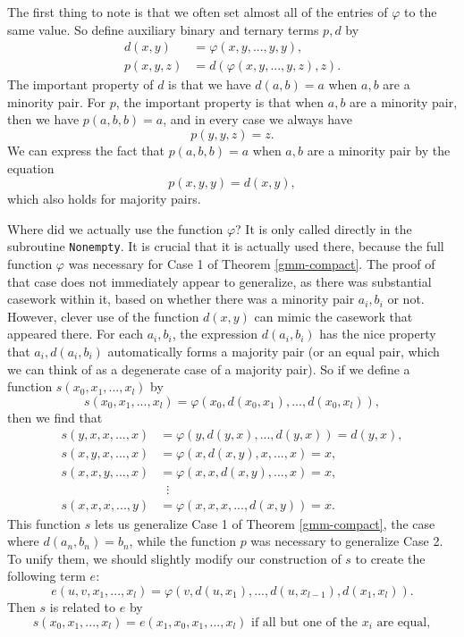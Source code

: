 \documentclass[letterpaper,11pt]{article}
\begin{document}
The first thing to note is that we often set almost all of the entries of $\varphi$ to the same value. So define auxiliary binary and ternary terms $p,d$ by
\begin{align*}
d(x,y) &= \varphi(x,y,...,y,y),\\
p(x,y,z) &= d(\varphi(x,y,...,y,z),z).
\end{align*}
The important property of $d$ is that we have $d(a,b) = a$ when $a,b$ are a minority pair. For $p$, the important property is that when $a,b$ are a minority pair, then we have $p(a,b,b) = a$, and in every case we always have
\[
p(y,y,z) = z.
\]
We can express the fact that $p(a,b,b) = a$ when $a,b$ are a minority pair by the equation
\[
p(x,y,y) = d(x,y),
\]
which also holds for majority pairs.

Where did we actually use the function $\varphi$? It is only called directly in the subroutine \texttt{Nonempty}. It is crucial that it is actually used there, because the full function $\varphi$ was necessary for Case 1 of Theorem \ref{gmm-compact}. The proof of that case does not immediately appear to generalize, as there was substantial casework within it, based on whether there was a minority pair $a_i,b_i$ or not. However, clever use of the function $d(x,y)$ can mimic the casework that appeared there. For each $a_i, b_i$, the expression $d(a_i,b_i)$ has the nice property that $a_i, d(a_i,b_i)$ automatically forms a majority pair (or an equal pair, which we can think of as a degenerate case of a majority pair). So if we define a function $s(x_0,x_1, ..., x_l)$ by
\[
s(x_0, x_1,..., x_l) = \varphi(x_0,d(x_0,x_1), ..., d(x_0,x_l)),
\]
then we find that
\begin{align*}
s(y,x,x,...,x) &= \varphi(y,d(y,x), ..., d(y,x)) = d(y,x),\\
s(x,y,x,...,x) &= \varphi(x, d(x,y), x, ..., x) = x,\\
s(x,x,y,...,x) &= \varphi(x, x, d(x,y), ..., x) = x,\\
&\;\; \vdots\\
s(x,x,x,...,y) &= \varphi(x, x, x, ..., d(x,y)) = x.
\end{align*}
This function $s$ lets us generalize Case 1 of Theorem \ref{gmm-compact}, the case where $d(a_n,b_n) = b_n$, while the function $p$ was necessary to generalize Case 2. To unify them, we should slightly modify our construction of $s$ to create the following term $e$:
\[
e(u,v,x_1, ..., x_l) = \varphi(v, d(u,x_1), ..., d(u,x_{l-1}),d(x_1,x_l)).
\]
Then $s$ is related to $e$ by
\[
s(x_0, x_1, ..., x_l) = e(x_1,x_0,x_1,...,x_l)\text{ if all but one of the }x_i\text{ are equal},
\]
\end{document}
